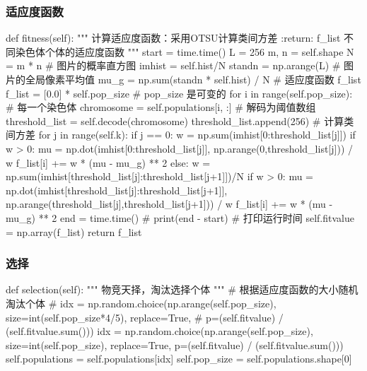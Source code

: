 \documentclass{article}
\begin{document}
\subsubsection{适应度函数}
\begin{python}
    def fitness(self):
        """
        计算适应度函数：采用OTSU计算类间方差
        :return: f_list 不同染色体个体的适应度函数
        """
        start = time.time()
        L = 256
        m, n = self.shape
        N = m * n
        # 图片的概率直方图
        imhist = self.hist/N
        standn = np.arange(L)
        # 图片的全局像素平均值
        mu_g = np.sum(standn * self.hist) / N
        # 适应度函数 f_list
        f_list = [0.0] * self.pop_size  # pop_size 是可变的
        for i in range(self.pop_size):
            # 每一个染色体
            chromosome = self.populations[i, :]
            # 解码为阈值数组
            threshold_list = self.decode(chromosome)
            threshold_list.append(256)
            # 计算类间方差
            for j in range(self.k):
                if j == 0:
                    w = np.sum(imhist[0:threshold_list[j]])
                    if w > 0:
                        mu = np.dot(imhist[0:threshold_list[j]], np.arange(0,threshold_list[j])) / w
                        f_list[i] += w * (mu - mu_g) ** 2
                else:
                    w = np.sum(imhist[threshold_list[j]:threshold_list[j+1]])/N
                    if w > 0:
                        mu = np.dot(imhist[threshold_list[j]:threshold_list[j+1]],
                                            np.arange(threshold_list[j],threshold_list[j+1])) / w
                        f_list[i] += w * (mu - mu_g) ** 2
        end = time.time()
        # print(end - start)  # 打印运行时间
        self.fitvalue = np.array(f_list)
        return f_list
\end{python}
\subsubsection{选择}
\begin{python}
    def selection(self):
        """
        物竞天择，淘汰选择个体
        """
        # 根据适应度函数的大小随机淘汰个体
        # idx = np.random.choice(np.arange(self.pop_size), size=int(self.pop_size*4/5), replace=True,
        #                        p=(self.fitvalue) / (self.fitvalue.sum()))
        idx = np.random.choice(np.arange(self.pop_size), size=int(self.pop_size), replace=True,
                               p=(self.fitvalue) / (self.fitvalue.sum()))
        self.populations = self.populations[idx]
        self.pop_size = self.populations.shape[0]
\end{python}
\end{document}
